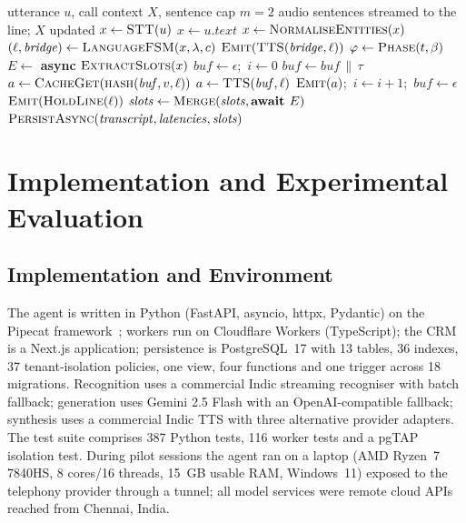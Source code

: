 \documentclass[conference]{IEEEtran}
\begin{document}
\begin{algorithm}[htbp]
\caption{Streaming turn}
\label{alg:turn}
\begin{algorithmic}[1]
\Require utterance $u$, call context $X$, sentence cap $m=2$
\Ensure audio sentences streamed to the line; $X$ updated
  \State $x\gets\textsc{STT}(u)$
\Else
  \State $x\gets u.\mathit{text}$ 
\EndIf
\State $x\gets\textsc{NormaliseEntities}(x)$
\State $(\ell,\mathit{bridge})\gets\textsc{LanguageFSM}(x,\lambda,c)$ 
 \State $\textsc{Emit}(\textsc{TTS}(\mathit{bridge},\ell))$ \EndIf
\State $\varphi\gets\textsc{Phase}(t,\beta)$
\State $E\gets$ \textbf{async} $\textsc{ExtractSlots}(x)$ 
\State $\mathit{buf}\gets\epsilon$;\ $i\gets 0$
  \State $\mathit{buf}\gets\mathit{buf}\,\|\,\tau$
    \State $a\gets\textsc{CacheGet}(\textsc{hash}(\mathit{buf},v,\ell))$
     \State $a\gets\textsc{TTS}(\mathit{buf},\ell)$ \EndIf
    \State $\textsc{Emit}(a)$;\ $i\gets i+1$;\ $\mathit{buf}\gets\epsilon$
  \EndIf
\EndFor
{} \State $\textsc{Emit}(\textsc{HoldLine}(\ell))$ \EndIf
\State $\mathit{slots}\gets\textsc{Merge}(\mathit{slots},\textbf{await }E)$ 
\State $\textsc{PersistAsync}(\mathit{transcript},\mathit{latencies},\mathit{slots})$
\end{algorithmic}
\end{algorithm}

\section{Implementation and Experimental Evaluation}\label{sec:eval}

\subsection{Implementation and Environment}
The agent is written in Python (FastAPI, asyncio, httpx, Pydantic) on the Pipecat framework~\cite{pipecat}; workers run on Cloudflare Workers (TypeScript); the CRM is a Next.js application; persistence is PostgreSQL~17 with 13 tables, 36 indexes, 37 tenant-isolation policies, one view, four functions and one trigger across 18 migrations. Recognition uses a commercial Indic streaming recogniser with batch fallback; generation uses Gemini 2.5 Flash with an OpenAI-compatible fallback; synthesis uses a commercial Indic TTS with three alternative provider adapters. The test suite comprises 387 Python tests, 116 worker tests and a pgTAP isolation test. During pilot sessions the agent ran on a laptop (AMD Ryzen~7 7840HS, 8 cores/16 threads, 15~GB usable RAM, Windows~11) exposed to the telephony provider through a tunnel; all model services were remote cloud APIs reached from Chennai, India.
\end{document}
